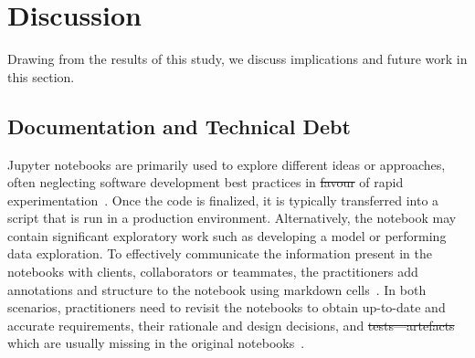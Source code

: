 \documentclass[smallextended]{svjour3}       %
\providecommand{\DIFadd}[1]{{\protect\color{blue}\uwave{#1}}} %
\providecommand{\DIFdel}[1]{{\protect\color{red}\sout{#1}}} %
\providecommand{\DIFaddbegin}{} %
\providecommand{\DIFaddend}{} %
\providecommand{\DIFdelbegin}{} %
\providecommand{\DIFdelend}{} %
\newcommand{\DIFscaledelfig}{0.5}
\newlength{\DIFdelgraphicswidth} %
\newlength{\DIFdelgraphicsheight} %
\newcommand{\DIFaddincludegraphics}[2][]{{\color{blue}\fbox{\DIFOincludegraphics[#1]{#2}}}} %
\newcommand{\DIFdelincludegraphics}[2][]{%
\sbox{\DIFdelgraphicsbox}{\DIFOincludegraphics[#1]{#2}}%
\settoboxwidth{\DIFdelgraphicswidth}{\DIFdelgraphicsbox} %
\settoboxtotalheight{\DIFdelgraphicsheight}{\DIFdelgraphicsbox} %
\scalebox{\DIFscaledelfig}{%
\parbox[b]{\DIFdelgraphicswidth}{\usebox{\DIFdelgraphicsbox}\\[-\baselineskip] \rule{\DIFdelgraphicswidth}{0em}}\llap{\resizebox{\DIFdelgraphicswidth}{\DIFdelgraphicsheight}{%
\setlength{\unitlength}{\DIFdelgraphicswidth}%
\begin{picture}(1,1)%
\thicklines\linethickness{2pt} %
{\color[rgb]{1,0,0}\put(0,0){\framebox(1,1){}}}%
{\color[rgb]{1,0,0}\put(0,0){\line( 1,1){1}}}%
{\color[rgb]{1,0,0}\put(0,1){\line(1,-1){1}}}%
\end{picture}%
}\hspace*{3pt}}} %
} %
\DeclareRobustCommand{\DIFaddbegin}{\DIFOaddbegin \let\includegraphics\DIFaddincludegraphics} %
\DeclareRobustCommand{\DIFaddend}{\DIFOaddend \let\includegraphics\DIFOincludegraphics} %
\DeclareRobustCommand{\DIFdelbegin}{\DIFOdelbegin \let\includegraphics\DIFdelincludegraphics} %
\DeclareRobustCommand{\DIFdelend}{\DIFOaddend \let\includegraphics\DIFOincludegraphics} %
\begin{document}
\section{Discussion}\label{sec:discuss}

Drawing from the results of this study, we discuss implications and future work in this section.

\DIFaddbegin 

\DIFaddend \subsection{Documentation and Technical Debt}

Jupyter notebooks are primarily used to explore different ideas or approaches, often neglecting software development best practices in \DIFdelbegin \DIFdel{favour }\DIFdelend \DIFaddbegin \DIFadd{favor }\DIFaddend of rapid experimentation~\citep{kery2018story,rule2018exploration,pimentel2019large-scale}. Once the code is finalized, it is typically transferred into a script that is run in a production environment. Alternatively, the notebook may contain significant exploratory work such as developing a model or performing data exploration. To effectively communicate the information present in the notebooks with clients, collaborators or teammates, the practitioners add annotations and structure to the notebook using markdown cells~\citep{kery2018story,rule2018exploration}. In both scenarios, practitioners need to revisit the notebooks to obtain up-to-date and accurate requirements, their rationale and design decisions, and \DIFdelbegin \DIFdel{tests---artefacts }\DIFdelend \DIFaddbegin \DIFadd{tests---artifacts }\DIFaddend which are usually missing in the original notebooks~\citep{pimentel2019large-scale,psallidas2019data,grotov2022large-scale}.
\end{document}
